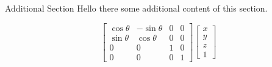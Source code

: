 \documentclass[10pt]{article}
\begin{document}
\begin{section}{Additional Section}
	Hello there some additional content of this section.
	
	\begin{equation}
		\begin{bmatrix}
			\cos{\theta} & -\sin{\theta} & 0 & 0 \\
			\sin{\theta} & \cos{\theta} & 0 & 0 \\
			0 & 0 & 1 & 0 \\
			0 & 0 & 0 & 1
		\end{bmatrix}
		\begin{bmatrix}
			x \\
			y \\
			z \\
			1
		\end{bmatrix}
	\end{equation}
\end{section}
	
\end{document}

